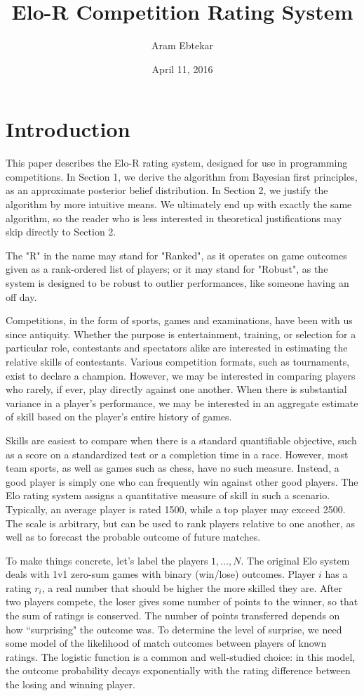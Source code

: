 \documentclass{article}
\title{Elo-R Competition Rating System}
\author{Aram Ebtekar}
\date{April 11, 2016}
\begin{document}
\maketitle

\section{Introduction}

This paper describes the Elo-R rating system, designed for use in programming competitions. In Section 1, we derive the algorithm from Bayesian first principles, as an approximate posterior belief distribution. In Section 2, we justify the algorithm by more intuitive means. We ultimately end up with exactly the same algorithm, so the reader who is less interested in theoretical justifications may skip directly to Section 2.

The "R" in the name may stand for "Ranked", as it operates on game outcomes given as a rank-ordered list of players; or it may stand for "Robust", as the system is designed to be robust to outlier performances, like someone having an off day.

Competitions, in the form of sports, games and examinations, have been with us since antiquity. Whether the purpose is entertainment, training, or selection for a particular role, contestants and spectators alike are interested in estimating the relative skills of contestants. Various competition formats, such as tournaments, exist to declare a champion. However, we may be interested in comparing players who rarely, if ever, play directly against one another. When there is substantial variance in a player's performance, we may be interested in an aggregate estimate of skill based on the player's entire history of games.

Skills are easiest to compare when there is a standard quantifiable objective, such as a score on a standardized test or a completion time in a race.  However, most team sports, as well as games such as chess, have no such measure. Instead, a good player is simply one who can frequently win against other good players. The Elo rating system assigns a quantitative measure of skill in such a scenario. Typically, an average player is  rated 1500, while a top player may exceed 2500. The scale is arbitrary, but can be used to rank players relative to one another, as well as to forecast the probable outcome of future matches.

To make things concrete, let's label the players $1,\ldots,N$. The original Elo system deals with 1v1 zero-sum games with binary (win/lose) outcomes. Player $i$ has a rating $r_i$, a real number that should be higher the more skilled they are. After two players compete, the loser gives some number of points to the winner, so that the sum of ratings is conserved. The number of points transferred depends on how ``surprising" the outcome was. To determine the level of surprise, we need some model of the likelihood of match outcomes between players of known ratings. The logistic function is a common and well-studied choice: in this model, the outcome probability decays exponentially with the rating difference between the losing and winning player.
\end{document}
